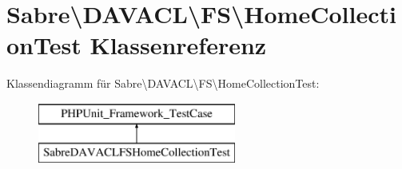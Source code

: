 \hypertarget{class_sabre_1_1_d_a_v_a_c_l_1_1_f_s_1_1_home_collection_test}{}\section{Sabre\textbackslash{}D\+A\+V\+A\+CL\textbackslash{}FS\textbackslash{}Home\+Collection\+Test Klassenreferenz}
\label{class_sabre_1_1_d_a_v_a_c_l_1_1_f_s_1_1_home_collection_test}
Klassendiagramm für Sabre\textbackslash{}D\+A\+V\+A\+CL\textbackslash{}FS\textbackslash{}Home\+Collection\+Test\+:\begin{figure}[H]
\begin{center}
\leavevmode
\includegraphics[height=2.000000cm]{class_sabre_1_1_d_a_v_a_c_l_1_1_f_s_1_1_home_collection_test}
\end{center}
\end{figure}
